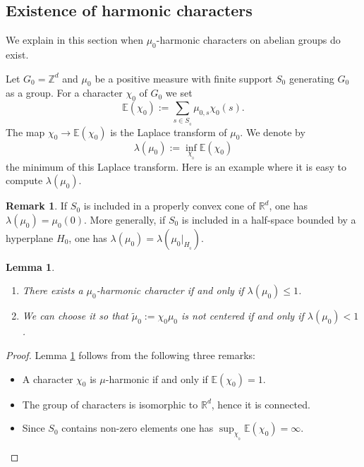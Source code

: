 \documentclass[11pt]{article}
\newcommand{\skpt}{\smallskip}
\numberwithin{equation}{section}
\newenvironment{enumeratea}
{\bgroup\def\theenumi{\alph{enumi}}\begin{enumerate}}
{\end{enumerate}\egroup}
\newtheorem{Lem}[Thm]{Lemma}
\theoremstyle{definition}
\newtheorem{Rem}[Thm]{Remark}
\newcommand{\m}[1]{\mathbb{ #1}}
\let\la\lambda
\let\bq\relax
\let\eq\relax
\let\ra\to
\begin{document}
\subsection{Existence of harmonic characters}
\label{secharcha}

\bq
We explain in this section when $\mu_0$\nobreakdash-har\-monic characters
on abelian groups do exist.
\eq

Let $G_0=\m Z^d$ and $\mu_0$ be a
positive measure with finite support $S_0$ generating $G_0$ as a group.
For a character $\chi_0$ of $G_0$ we set
\[
\m E(\chi_0):=\sum_{s\in S_{_0}}\mu_{0,s}\chi_0(s).
\]
The map $\chi_0\ra\m E(\chi_0)$ is the Laplace transform of $\mu_0$.
We denote by
\begin{equation}
\label{eqnlamuoo}
\la(\mu_0):=\inf_{\chi_{_0}} \m E(\chi_0)
\end{equation}
the minimum of this Laplace transform.
Here is an example where it is easy to compute $\la(\mu_0)$.

\begin{Rem}
\label{remlammuo}
If $S_0$ is included in a properly convex cone of $\m R^d$, one has \hbox{$\la(\mu_0)=\mu_0(0)$}.
More generally, if $S_0$ is included in a half-space bounded by a hyperplane $H_0$, one has $\la(\mu_0)=\la(\mu_0|_{H_{_0}})$.
\end{Rem}

\skpt
\begin{Lem}
\label{lemharcha}
\begin{enumeratea}
\item\label{lemharchaa}
There exists a $\mu_0$-harmonic character if and only if
$\la(\mu_0)\leq 1$.

\item\label{lemharchab}
We can choose it so that $\widetilde{\mu}_0:=\chi_0\mu_0$ is not centered if and only if
$\la(\mu_0)< 1$.
\end{enumeratea}
\end{Lem}

\begin{proof} Lemma \ref{lemharcha} follows from the following three remarks:
\begin{itemize}
\item
A character $\chi_0$ is $\mu$-harmonic if and only if $\m E(\chi_0)=1$.\item
The group of characters is isomorphic to $\m R^d$, hence it is connected.
\item
Since $S_0$ contains non-zero elements one has $\sup_{\chi_{_0}}\m E(\chi_0)=\infty$.\qedhere
\end{itemize}
\end{proof}
\end{document}
